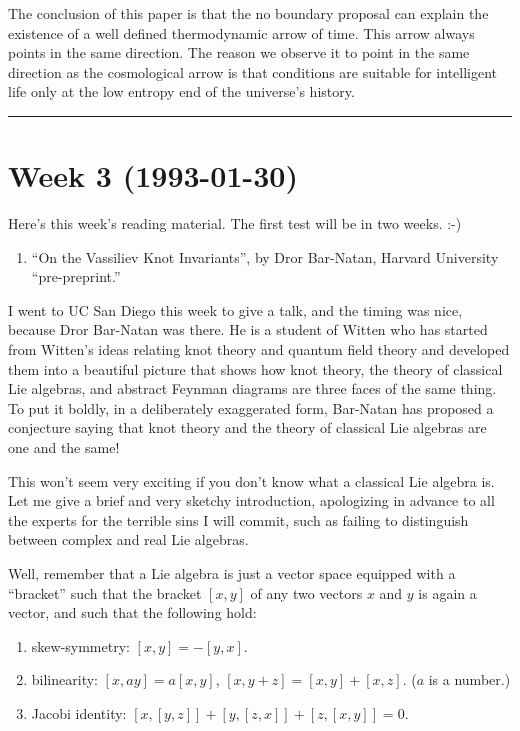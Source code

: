 \documentclass{article}
\def\tightlist{}
\begin{document}
The conclusion of this paper is that the no boundary proposal can
explain the existence of a well defined thermodynamic arrow of time.
This arrow always points in the same direction. The reason we observe it
to point in the same direction as the cosmological arrow is that
conditions are suitable for intelligent life only at the low entropy end
of the universe's history.

\begin{center}\rule{0.5\linewidth}{0.5pt}\end{center}
\hypertarget{week3}{%
\section{Week 3 (1993-01-30)}\label{week3}}

Here's this week's reading material. The first test will be in two
weeks. :-)

\begin{enumerate}
\def\labelenumi{\arabic{enumi})}
\tightlist
\item
  ``On the Vassiliev Knot Invariants'', by Dror Bar-Natan, Harvard
  University ``pre-preprint.''
\end{enumerate}

I went to UC San Diego this week to give a talk, and the timing was
nice, because Dror Bar-Natan was there. He is a student of Witten who
has started from Witten's ideas relating knot theory and quantum field
theory and developed them into a beautiful picture that shows how knot
theory, the theory of classical Lie algebras, and abstract Feynman
diagrams are three faces of the same thing. To put it boldly, in a
deliberately exaggerated form, Bar-Natan has proposed a conjecture
saying that knot theory and the theory of classical Lie algebras are one
and the same!

This won't seem very exciting if you don't know what a classical Lie
algebra is. Let me give a brief and very sketchy introduction,
apologizing in advance to all the experts for the terrible sins I will
commit, such as failing to distinguish between complex and real Lie
algebras.

Well, remember that a Lie algebra is just a vector space equipped with a
``bracket'' such that the bracket \([x,y]\) of any two vectors \(x\) and
\(y\) is again a vector, and such that the following hold:

\begin{enumerate}
\def\labelenumi{\alph{enumi})}
\tightlist
\item
  skew-symmetry: \([x,y] = -[y,x]\).
\item
  bilinearity: \([x,ay] = a[x,y]\), \([x,y+z] = [x,y] + [x,z]\). (\(a\)
  is a number.)
\item
  Jacobi identity: \([x,[y,z]] + [y,[z,x]] + [z,[x,y]] = 0\).
\end{enumerate}
\end{document}
